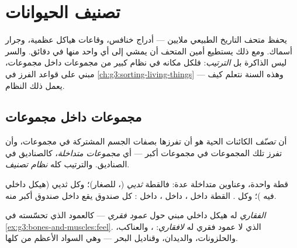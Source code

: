 \chapter{تصنيف الحيوانات}\label{ch:g4:classifying-animals}

يحفظ متحف التاريخ الطبيعي ملايين  --- أدراج خنافس، وقاعات
هياكل عظمية، وجرار أسماك. ومع ذلك يستطيع أمين المتحف أن يمشي إلى
أي واحد منها في دقائق. والسر ليس الذاكرة بل \emph{الترتيب}: فلكل
 مكانه في نظام كبير من مجموعات داخل مجموعات، مبني على قواعد
الفرز في \cref{ch:g3:sorting-living-things} --- وهذه السنة نتعلم
كيف يعمل ذلك النظام.

\section{مجموعات داخل مجموعات}

\begin{definition}[التصنيف]\label{def:g4:classifying-animals:classification}
أن \emph{تصنّف} الكائنات الحية هو أن تفرزها بصفات
الجسم المشتركة في مجموعات، وأن تفرز تلك المجموعات في مجموعات أكبر
--- أي \emph{مجموعات متداخلة}، كالصناديق في
الصناديق. والترتيب كله \emph{نظام تصنيف}.
\end{definition}

\begin{example}\label{ex:g4:classifying-animals:cat}
قطة واحدة، وعناوين متداخلة عدة: فالقطة \emph{ثديي} (، 
للصغار)؛ وكل ثديي \emph{} (هيكل داخلي فيه )؛ وكل
 \emph{}. القطة داخل ،  داخل
،  داخل : كل صندوق يقع داخل صندوق
أكبر منه.
\end{example}

\begin{definition}\label{def:g4:classifying-animals:vertebrate}
\emph{الفقاري}  له هيكل داخلي مبني حول
\emph{عمود فقري} --- كالعمود الذي تحسّسته في
\cref{ex:g3:bones-and-muscles:feel}.  الذي لا عمود فقري
له \emph{لافقاري}: ، والعناكب، والحلزونات،
والديدان، وقناديل البحر --- وهي السواد الأعظم من  كلها.
\end{definition}


